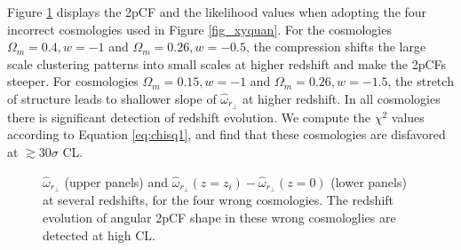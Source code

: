 \documentclass[iop]{emulateapj}
\begin{document}


Figure \ref{fig_cosmo} displays the 2pCF and the likelihood values when adopting 
the four incorrect cosmologies used in Figure \ref{fig_xyquan}.
For the cosmologies $\Omega_m=0.4,w=-1$ and $\Omega_m=0.26,w=-0.5$,
the compression shifts the large scale clustering patterns into small scales
at higher redshift and make the 2pCFs steeper.
For cosmologies $\Omega_m=0.15,w=-1$ and $\Omega_m=0.26,w=-1.5$,
the stretch of structure leads to shallower slope of $\hat{\omega}_{r_\perp}$ at higher redshift.
In all cosmologies there is significant detection of redshift evolution.
We compute the $\chi^2$ values according to Equation \ref{eq:chisq1}, 
and find that these cosmologies are disfavored 
at $\gtrsim30\sigma$ CL.


\begin{figure}
   \caption{\label{fig_cosmo}
    $\hat{\omega}_{r_\perp}$ (upper panels) and $\hat{\omega}_{r_\perp}(z=z_i) - \hat{\omega}_{r_\perp}(z=0)$ (lower panels) at several redshifts,
    for the four wrong cosmologies.
    The redshift evolution of angular 2pCF shape in these wrong cosmologlies are detected at high CL.
   }
\end{figure}
\end{document}
